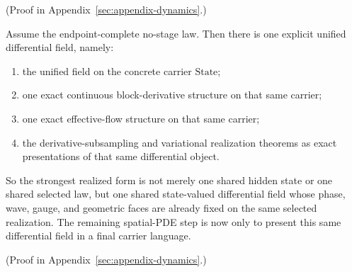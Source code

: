 (Proof in Appendix~\ref{sec:appendix-dynamics}.)

\begin{corollary}
\label{cor:endpoint-complete-no-stage-law-already-yields-one-unified-differential-field-package}
Assume the endpoint-complete no-stage law. Then there is one explicit
unified differential field, namely:
\begin{enumerate}[label=(\roman*), leftmargin=2em, itemsep=0.2em]
\item the unified field on the concrete carrier \(\mathrm{State}\);
\item one exact continuous block-derivative structure on that same carrier;
\item one exact effective-flow structure on that same carrier;
\item the derivative-subsampling and variational realization theorems
      as exact presentations of that same differential object.
\end{enumerate}
So the strongest realized form is not merely one shared hidden
state or one shared selected law, but one shared state-valued differential field whose
phase, wave, gauge, and geometric faces are already fixed on the same selected
realization. The remaining spatial-PDE step is now only to present this same
differential field in a final carrier language.
\end{corollary}

(Proof in Appendix~\ref{sec:appendix-dynamics}.)

